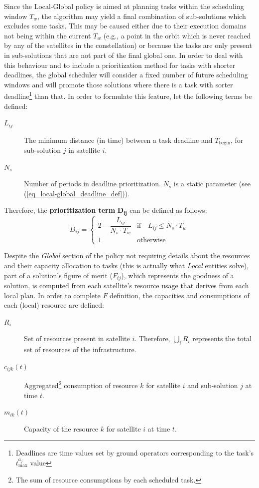 Since the Local-Global policy is aimed at planning tasks within the scheduling window $T_w$, the algorithm may yield a final combination of sub-solutions which excludes some tasks. This may be caused either due to their execution domains not being within the current $T_w$ (e.g., a point in the orbit which is never reached by any of the satellites in the constellation) or because the tasks are only present in sub-solutions that are not part of the final global one. In order to deal with this behaviour and to include a prioritization method for tasks with shorter deadlines, the global scheduler will consider a fixed number of future scheduling windows and will promote those solutions where there is a task with sorter deadline\footnote{Deadlines are time values set by ground operators corresponding to the task's $t_{\text{max}}^{a_j}$ value} than that. In order to formulate this feature, let the following terms be defined:
\begin{description}%
\item[$L_{ij}$] The minimum distance (in time) between a task deadline and $T_\text{begin}$, for sub-solution $j$ in satellite $i$. 
\item[$N_s$] Number of periods in deadline prioritization. $N_s$ is a static parameter (see (\ref{eq_local-global_deadline_def})). 
\end{description}

Therefore, the \textbf{prioritization term} $\mathbf{D_{ij}}$ can be defined as follows:
\begin{equation}
\label{eq_local-global_deadline_def}
D_{ij} = 
\begin{cases}
2-\dfrac{L_{ij}}{N_s \cdot T_w} & \text{if} \quad L_{ij} \leq N_s \cdot T_w\\
1 & \text{otherwise}
\end{cases}
\end{equation}

Despite the \emph{Global} section of the policy not requiring details about the resources and their capacity allocation to tasks (this is actually what \emph{Local} entities solve), part of a solution's figure of merit ($F_{ij}$), which represents the goodness of a solution, is computed from each satellite's resource usage that derives from each local plan. In order to complete $F$ definition, the capacities and consumptions of each (local) resource are defined:

\begin{description}
\item[$R_i$] Set of resources present in satellite $i$. Therefore, $\bigcup_i{R_i}$ represents the total set of resources of the infrastructure.
\item[$c_{ijk}(t)$] Aggregated\footnote{The sum of resource consumptions by each scheduled task.} consumption of resource $k$ for satellite $i$ and sub-solution $j$ at time $t$.
\item[$m_{ik}(t)$] Capacity of the resource $k$ for satellite $i$ at time $t$.
\end{description}

